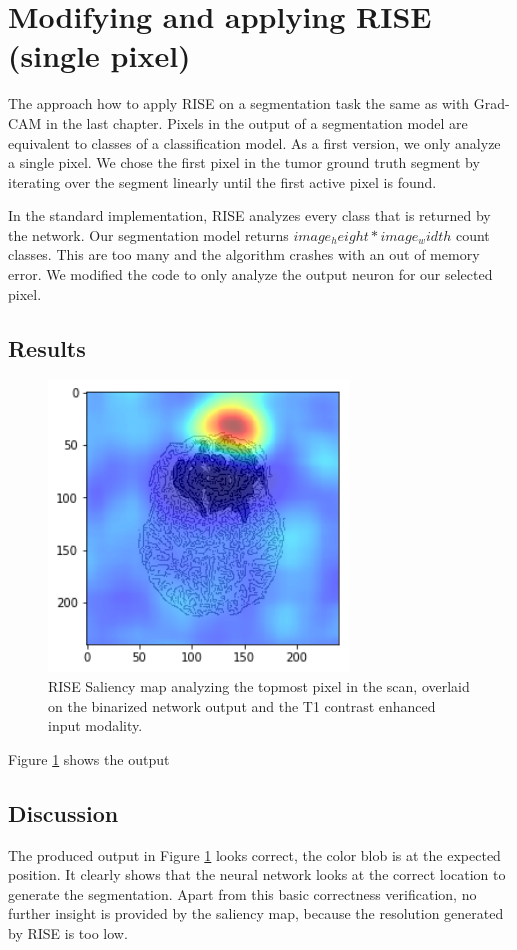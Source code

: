\section{Modifying and applying RISE (single pixel)}

The approach how to apply RISE on a segmentation task the same as with Grad-CAM in the last chapter. Pixels in the output of a segmentation model are equivalent to classes of a classification model.
As a first version, we only analyze a single pixel. We chose the first pixel in the tumor ground truth segment by iterating over the segment linearly until the first active pixel is found.

In the standard implementation, RISE analyzes every class that is returned by the network. Our segmentation model returns $ image_height * image_width $ count classes. This are too many
and the algorithm crashes with an out of memory error. We modified the code to only analyze the output neuron for our selected pixel.

\subsection{Results}

\begin{figure}[H]
\centering
\includegraphics[width=8cm]{chapters/04_segmentation/images/rise_single_pixel.png}
\caption{RISE Saliency map analyzing the topmost pixel in the scan, overlaid on the binarized network output and the T1 contrast enhanced input modality.}
\label{rise_single_pixel_result}
\end{figure}

Figure \ref{rise_single_pixel_result} shows the output 

\subsection{Discussion}
The produced output in Figure \ref{rise_single_pixel_result} looks correct, the color blob is at the expected position. It clearly shows that the neural network looks at the correct location to generate the segmentation.
Apart from this basic correctness verification, no further insight is provided by the saliency map, because the resolution generated by RISE is too low.

